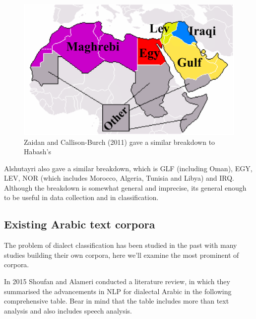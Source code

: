 \documentclass[12pt]{diazessay}
\begin{document}
        \begin{figure}[h]
            \centering
            \includegraphics[scale=0.2]{Figures/Zaidan and Burch dialect breakdown.png}
            \caption{Zaidan and Callison-Burch (2011) gave a similar breakdown\cite{zaidan_burch} to Habash's}
            \label{fig:cmp}
        \end{figure}
        
        Alshutayri also gave a similar breakdown, which is GLF (including Oman), EGY, LEV, NOR (which includes Morocco, Algeria, Tunisia and Libya) and IRQ. Although the breakdown is somewhat general and imprecise, its general enough to be useful in data collection and in classification\cite{alshutayri}.
        
        
    \subsection{Existing Arabic text corpora}
    The problem of dialect classification has been studied in the past with many studies building their own corpora, here we'll examine the most prominent of corpora.
    
    In 2015 Shoufan and Alameri conducted a literature review, in which they summarised the advancements in NLP for dialectal Arabic in the following comprehensive table\cite{shoufan_alameri_2015_natural}. Bear in mind that the table includes more than text analysis and also includes speech analysis.
    
\end{document}
